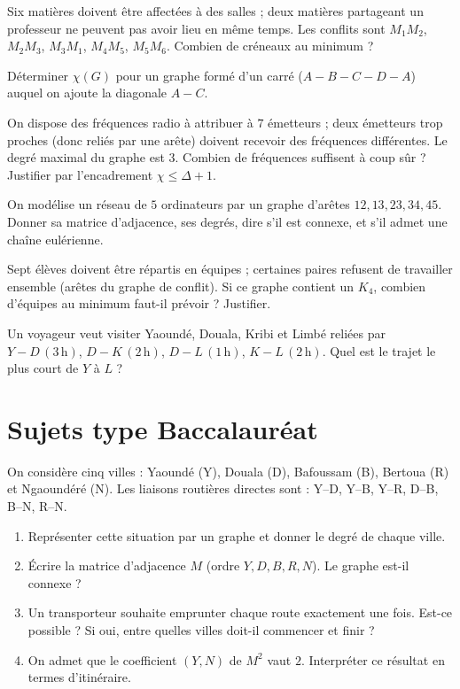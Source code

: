 \exo{} Six matières doivent être affectées à des salles ; deux matières partageant un
professeur ne peuvent pas avoir lieu en même temps. Les conflits sont $M_1M_2$, $M_2M_3$,
$M_3M_1$, $M_4M_5$, $M_5M_6$. Combien de créneaux au minimum ?

\exo{} Déterminer $\chi(G)$ pour un graphe formé d'un carré ($A\!-\!B\!-\!C\!-\!D\!-\!A$)
auquel on ajoute la diagonale $A\!-\!C$.

\exo{} On dispose des fréquences radio à attribuer à $7$ émetteurs ; deux émetteurs
trop proches (donc reliés par une arête) doivent recevoir des fréquences différentes. Le degré
maximal du graphe est $3$. Combien de fréquences suffisent à coup sûr ? Justifier par
l'encadrement $\chi\le\Delta+1$.

\exo{} On modélise un réseau de $5$ ordinateurs par un graphe d'arêtes $12,13,23,34,45$.
Donner sa matrice d'adjacence, ses degrés, dire s'il est connexe, et s'il admet une chaîne
eulérienne.

\exo{} Sept élèves doivent être répartis en équipes ; certaines paires refusent de
travailler ensemble (arêtes du graphe de conflit). Si ce graphe contient un $K_4$, combien
d'équipes au minimum faut-il prévoir ? Justifier.

\exo{} Un voyageur veut visiter Yaoundé, Douala, Kribi et Limbé reliées par
$Y\!-\!D\,(3\,\text{h})$, $D\!-\!K\,(2\,\text{h})$, $D\!-\!L\,(1\,\text{h})$,
$K\!-\!L\,(2\,\text{h})$. Quel est le trajet le plus court de $Y$ à $L$ ?

\section{Sujets type Baccalauréat}

On considère cinq villes : Yaoundé (Y), Douala (D), Bafoussam (B), Bertoua (R) et
Ngaoundéré (N). Les liaisons routières directes sont : Y–D, Y–B, Y–R, D–B, B–N, R–N.
\begin{enumerate}[label=\arabic*)]
\item Représenter cette situation par un graphe et donner le degré de chaque ville.
\item Écrire la matrice d'adjacence $M$ (ordre $Y,D,B,R,N$). Le graphe est-il connexe ?
\item Un transporteur souhaite emprunter chaque route exactement une fois. Est-ce possible ?
Si oui, entre quelles villes doit-il commencer et finir ?
\item On admet que le coefficient $(Y,N)$ de $M^2$ vaut $2$. Interpréter ce résultat
en termes d'itinéraire.
\end{enumerate}

